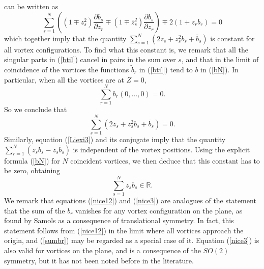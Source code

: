 \documentclass[a4paper,11pt]{article}
\begin{document}
can be written as
\[
\sum_{s=1}^{N}\left((1\mp{z}_{s}^{2})\frac{\partial {b}_{s}}
{\partial {z}_{r}} 
\mp(1\mp \bar{z}_{s}^{2})\frac{\partial \bar{b}_{s}}{\partial {z}_{r}}\right)
\mp 2(1+{z}_{r}{b}_{r})=0
\]
which together imply that the quantity
$\sum_{s=1}^{N}(2z_{s}+z_{s}^{2}b_{s}+\bar{b}_{s})$
is constant for all vortex configurations. 
To find what this constant is, we remark that all the singular parts
in (\ref{btil}) cancel in pairs in the sum over $s$, and that
in the limit of coincidence of the vortices the functions 
$\tilde{b}_{r}$ in (\ref{btil}) tend to $b$ in (\ref{bN}).
In particular, when all the vortices are at $Z=0$,
\begin{equation} \label{sumbr}
\sum_{r=1}^{N} b_{r}(0,\ldots,0)=0.
\end{equation}
So we conclude that
\begin{equation} \label{nice12}
\sum_{s=1}^{N}(2z_{s}+z_{s}^{2}b_{s}+\bar{b}_{s})=0.
\end{equation}
Similarly, equation (\ref{Liexi3}) and its conjugate
imply that the quantity 
$\sum_{r=1}^{N}(z_{s}b_{s}-\bar{z}_{s}\bar{b}_{s})$
is independent of the vortex positions. 
Using the explicit formula (\ref{bN}) for $N$ coincident vortices,
we then deduce that this constant has to be zero, obtaining
\begin{equation}\label{nice3}
\sum_{s=1}^{N} z_{s}b_{s} \in \mathbb{R}.
\end{equation}
We remark that equations (\ref{nice12}) and (\ref{nice3}) are
analogues of the statement that the sum of the $b_{r}$ vanishes
for any vortex configuration on the plane, as found by
Samols \cite{Sam} as a consequence of translational symmetry.
In fact, this statement follows from (\ref{nice12}) in the limit where
all vortices approach the origin, and (\ref{sumbr}) may be
regarded as a special case of it. Equation (\ref{nice3}) is also
valid for vortices on the plane, and is a consequence of the $SO(2)$ 
symmetry, but it has not been noted before in the literature.
\end{document}

